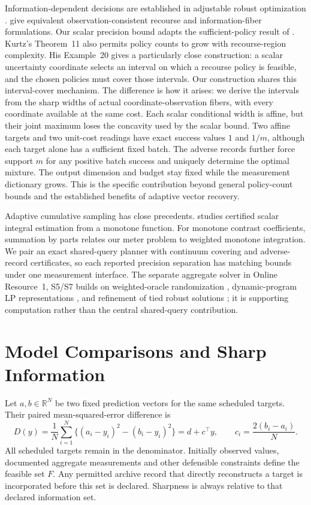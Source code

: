 Information-dependent decisions are established in adjustable robust
optimization \citep{wei2024}. \citet[Section~3.2, Eq.~(3) and
Theorem~3.2, author manuscript v3]{ddid} give equivalent
observation-consistent recourse and information-fiber formulations.
Our scalar precision bound adapts the
sufficient-policy result of \citet[Theorem~2 and Example~5]{kurtz2026}.
Kurtz's Theorem~11 also permits policy counts to grow with recourse-region
complexity. His Example~20 gives a particularly close construction: a
scalar uncertainty coordinate selects an interval on which a recourse
policy is feasible, and the chosen policies must cover those intervals.
Our construction shares this interval-cover mechanism. The difference is
how it arises: we derive the intervals from the sharp widths of actual
coordinate-observation fibers, with every coordinate available at the same
cost. Each scalar conditional width is affine, but their joint maximum
loses the concavity used by the scalar bound. Two
affine targets and two unit-cost readings have exact success values $1$
and $1/m$, although each target alone has a sufficient fixed batch.
The adverse records further force support $m$ for any positive batch
success and uniquely determine the optimal mixture. The output dimension
and budget stay fixed while the measurement dictionary grows. This is the
specific contribution beyond general policy-count bounds and the established
benefits of adaptive vector recovery.

Adaptive cumulative sampling has close precedents.
\citet[Section~4.1.1, Corollary~1 and Theorem~3]{gaillard2023} studies
certified scalar integral estimation from a monotone function. For monotone
contrast coefficients, summation by parts relates our meter problem to
weighted monotone integration. We pair an exact shared-query planner with
continuum covering and adverse-record certificates, so each reported
precision separation has matching bounds under one measurement interface.
The separate aggregate solver in Online Resource~1, S5/S7 builds on
weighted-oracle randomization \citep{kawase2024}, dynamic-program LP
representations \citep{martin1990}, and refinement of tied robust solutions
\citep{iancu2014}; it is supporting computation rather than the central
shared-query contribution.

\section{Model Comparisons and Sharp Information}
Let $a,b\in\mathbb R^N$ be two fixed prediction vectors for the same
scheduled targets. Their paired mean-squared-error difference is
\begin{equation}
 D(y)=\frac1N\sum_{i=1}^N\{(a_i-y_i)^2-(b_i-y_i)^2\}
 =d+c^\top y,\qquad c_i=\frac{2(b_i-a_i)}N.
 \label{eq:linear}
\end{equation}
All scheduled targets remain in the denominator. Initially observed values,
documented aggregate measurements and other defensible constraints define
the feasible set $F$. Any permitted archive record that directly reconstructs
a target is incorporated before this set is declared. Sharpness is always
relative to that declared information set.

